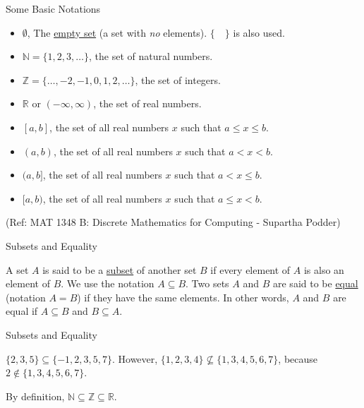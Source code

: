 \begin{frame}{Some Basic Notations}

\begin{itemize}
\item $\emptyset$, The \underline{empty set} (a set with \textit{no} elements). $\{\quad\}$ is also used. 
\item $\mathbb{N}=\{1,2,3,\ldots\}$, the set of natural numbers.
\item $\mathbb{Z}=\{\ldots,-2,-1,0,1,2,\ldots\}$, the set of integers. 
\item $\mathbb{R}$ or $(-\infty,\infty)$, the set of real numbers. 
\item $[a,b]$, the set of all real numbers $x$ such that $a\leq x \leq b$.
\item $(a,b)$, the set of all real numbers $x$ such that $a< x < b$. 
\item $(a,b]$, the set of all real numbers $x$ such that $a< x \leq  b$. 
\item $[a,b)$, the set of all real numbers $x$ such that $a\leq x< b$. 
\end{itemize}

\tiny{(Ref: MAT 1348 B: Discrete Mathematics for Computing - Supartha Podder)}

\end{frame}

\begin{frame}{Subsets and Equality}
\begin{definition} A set $A$ is said to be a \underline{subset} of another set $B$  if every element of $A$ is also an element of $B$.  We use the notation $A\subseteq B$.  Two sets $A$ and $B$ are said to be \underline{equal} (notation $A=B$)  if they have the same elements.  In other words, $A$ and $B$ are equal if $A\subseteq B$ and $B\subseteq A$.
\end{definition}
\end{frame}

\begin{frame}{Subsets and Equality}
\begin{example} $\{2,3,5\}\subseteq \{-1,2,3,5,7\}$.  However, $\{1,2,3,4\} \nsubseteq \{1,3,4,5,6,7\}$,  because $2\notin \{1,3,4,5,6,7\}$.
\end{example}

\begin{example} By definition, $\mathbb{N}\subseteq \mathbb{Z}\subseteq \mathbb{R}$.
\end{example}
\end{frame}


